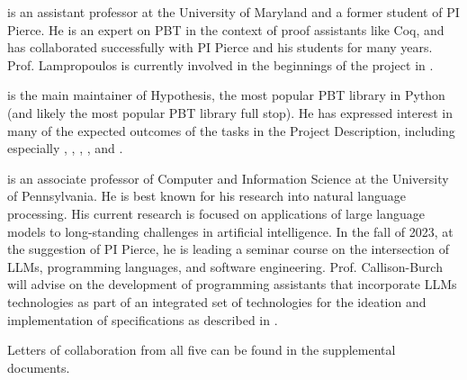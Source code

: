 \smallskip{} is an assistant professor at the
University of Maryland and a former student of PI Pierce.  He is an expert on
PBT in the context of proof assistants like Coq, and has collaborated
successfully with PI Pierce and his students for many years. Prof. Lampropoulos
is currently involved in the beginnings of the project in
.

\smallskip{} is the main maintainer of
Hypothesis, the most popular PBT library in Python (and likely the
most popular PBT library full stop). He has expressed interest in many
of the expected outcomes of the tasks in the Project Description,
including especially ,
, ,
, and .

\smallskip{} is an associate professor of
Computer and Information Science at the University of Pennsylvania.
%
He is best known for his research into natural language
processing. His current research is focused on applications of large
language models to long-standing challenges in artificial
intelligence. In the fall of 2023, at the suggestion of PI Pierce, he
is leading a seminar course on the intersection of LLMs, programming
languages, and software engineering. Prof. Callison-Burch will advise
on the development of programming assistants that incorporate LLMs
technologies as part of an integrated set of technologies for the
ideation and implementation of specifications as described in .

\bigskip

\noindent Letters of collaboration from all five can be found in the supplemental
documents.
